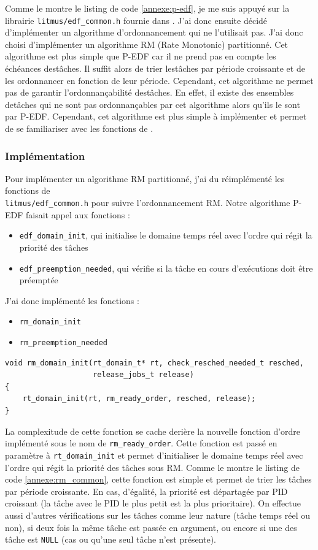 Comme le montre le listing de code \ref{annexe:p-edf}, je me suis appuyé sur la librairie \texttt{litmus/edf\_common.h} fournie dans \litmus. J'ai donc ensuite décidé d'implémenter un algorithme d'ordonnancement qui ne l'utilisait pas. J'ai donc choisi d'implémenter un algorithme RM (Rate Monotonic) partitionné. Cet algorithme est plus simple que P-EDF car il ne prend pas en compte les échéances destâches. Il suffit alors de trier lestâches par période croissante et de les ordonnancer en fonction de leur période. Cependant, cet algorithme ne permet pas de garantir l'ordonnançabilité destâches. En effet, il existe des ensembles detâches qui ne sont pas ordonnançables par cet algorithme alors qu'ils le sont par P-EDF. Cependant, cet algorithme est plus simple à implémenter et permet de se familiariser avec les fonctions de \litmus.


\subsubsection{Implémentation}

Pour implémenter un algorithme RM partitionné, j'ai du réimplémenté les fonctions de \\ \texttt{litmus/edf\_common.h} pour suivre l'ordonnancement RM. Notre algorithme P-EDF faisait appel aux fonctions :
\begin{itemize}
    \item \texttt{edf\_domain\_init}, qui initialise le domaine temps réel avec l'ordre qui régit la priorité des tâches
    \item \texttt{edf\_preemption\_needed}, qui vérifie si la tâche en cours d'exécutions doit être préemptée
\end{itemize}
J'ai donc implémenté les fonctions :
\begin{itemize}
    \item \texttt{rm\_domain\_init}
    \item \texttt{rm\_preemption\_needed}
\end{itemize}

\begin{lstlisting}[style=cstyle, caption={Fonction \texttt{rm\_domain\_init}}, label={annexe:rm_domain_init}]
void rm_domain_init(rt_domain_t* rt, check_resched_needed_t resched,
					release_jobs_t release)
{
	rt_domain_init(rt, rm_ready_order, resched, release);
}
\end{lstlisting}

La complexitude de cette fonction se cache derière la nouvelle fonction d'ordre implémenté sous le nom de \texttt{rm\_ready\_order}. Cette fonction est passé en paramètre à \texttt{rt\_domain\_init} et permet d'initialiser le domaine temps réel avec l'ordre qui régit la priorité des tâches sous RM. Comme le montre le listing de code \ref{annexe:rm_common}, cette fonction est simple et permet de trier les tâches par période croissante. En cas, d'égalité, la priorité est départagée par PID croissant (la tâche avec le PID le plus petit est la plus prioritaire). On effectue aussi d'autres vérifications sur les tâches comme leur nature (tâche temps réel ou non), si deux fois la même tâche est passée en argument, ou encore si une des tâche est \texttt{NULL} (cas ou qu'une seul tâche n'est présente).

